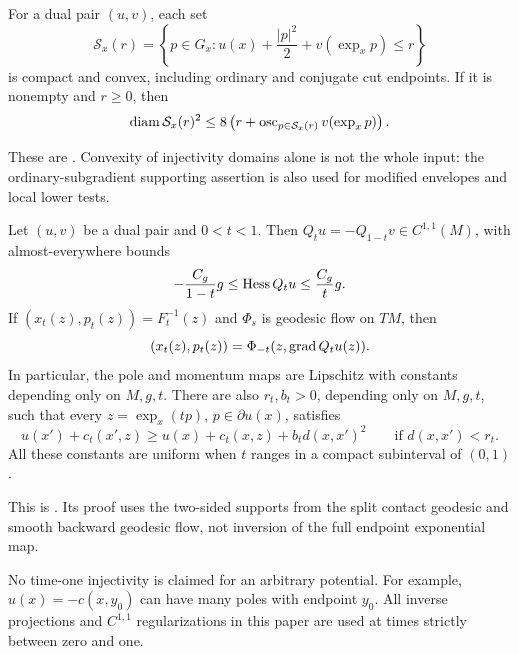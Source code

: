 \begin{corollary}\label{geo:sections}
For a dual pair $(u,v)$, each set
\[
 \mathcal S_x(r)=\left\{p\in G_x:
      u(x)+\frac{|p|^2}{2}+v(\exp_xp)\leq r\right\}
\]
is compact and convex, including ordinary and conjugate cut
endpoints. If it is nonempty and $r\geq0$, then
\[
 \operatorname{diam}\mathcal S_x(r)^2
 \leq8\left(r+\operatorname{osc}_{p\in\mathcal S_x(r)}v(\exp_xp)\right).
\]
\end{corollary}

These are \cite[Theorem~4.8 and Corollaries~4.9--4.10]{Foundation2026}.
Convexity of
injectivity domains alone is not the whole input: the
ordinary-subgradient supporting assertion is also used for
modified envelopes and local lower tests.

\begin{proposition}
\label{geo:intermediate}
Let $(u,v)$ be a dual pair and $0<t<1$. Then
$Q_tu=-Q_{1-t}v\in C^{1,1}(M)$, with almost-everywhere bounds
\[
 -\frac{C_g}{1-t}g\leq\operatorname{Hess} Q_tu\leq\frac{C_g}{t}g.
\]
If $(x_t(z),p_t(z))=F_t^{-1}(z)$ and $\Phi_s$ is geodesic
flow on $TM$, then
\[
 (x_t(z),p_t(z))=\Phi_{-t}(z,\operatorname{grad} Q_tu(z)).
\]
In particular, the pole and momentum maps are Lipschitz
with constants depending only on $M,g,t$.
There are also $r_t,b_t>0$, depending only on $M,g,t$,
such that every $z=\exp_x(tp)$, $p\in\partial u(x)$,
satisfies
\[
 u(x')+c_t(x',z)\geq
 u(x)+c_t(x,z)+b_t d(x,x')^2
 \qquad\text{if }d(x,x')<r_t.
\]
All these constants are uniform when $t$ ranges in a
compact subinterval of $(0,1)$.
\end{proposition}

This is \cite[Proposition~4.11]{Foundation2026}. Its proof uses the two-sided
supports from the split contact geodesic and smooth
backward geodesic flow, not inversion of the full
endpoint exponential map.

\begin{remark}\label{geo:time-one}
No time-one injectivity is claimed for an arbitrary
potential. For example, $u(x)=-c(x,y_0)$ can have many
poles with endpoint $y_0$. All inverse projections and
$C^{1,1}$ regularizations in this paper are used at
times strictly between zero and one.
\end{remark}
